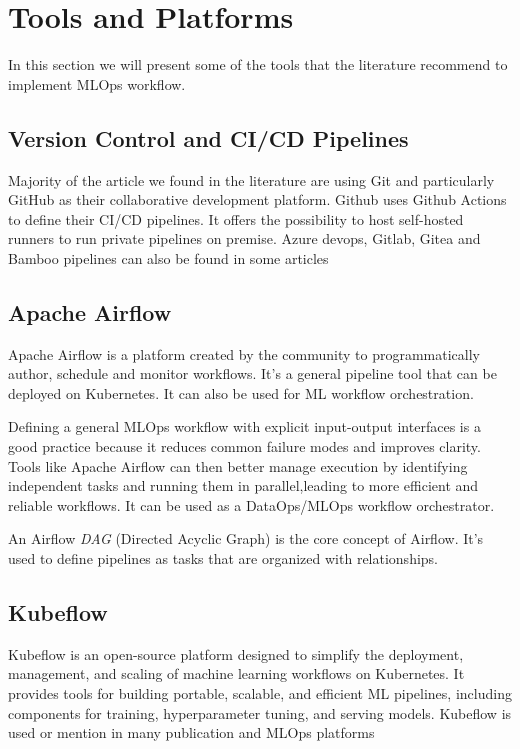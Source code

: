 \section{Tools and Platforms}\label{sec:tools}

In this section we will present some of the tools that the literature recommend to implement MLOps workflow.

\subsection{Version Control and CI/CD Pipelines}\label{subsec:version-control-and-ci/cd-pipelines}
Majority of the article we found in the literature are using Git and particularly GitHub\cite{github} as their collaborative development platform.
Github uses Github Actions to define their CI/CD pipelines.
It offers the possibility to host self-hosted runners to run private pipelines on premise.
Azure devops, Gitlab, Gitea and Bamboo pipelines can also be found in some articles\cite{Kreuzberger2022MachineLO}

\subsection{Apache Airflow}\label{subsec:apache-airflow}
Apache Airflow\cite{airflow} is a platform created by the community to programmatically author, schedule and monitor workflows\cite{airflow}.
It's a general pipeline tool that can be deployed on Kubernetes.
It can also be used for ML workflow orchestration\cite{Kreuzberger2022MachineLO}.

Defining a general MLOps workflow with explicit input-output interfaces is a good practice because it reduces common failure modes and improves clarity.
Tools like Apache Airflow can then better manage execution by identifying independent tasks and running them in parallel,leading to more efficient and reliable workflows.\cite{mlflow}
It can be used as a DataOps/MLOps workflow orchestrator\cite{10245408,mlflow}.

An Airflow \textit{DAG} (Directed Acyclic Graph) is the core concept of Airflow\cite{Kreuzberger2022MachineLO, airflow}.
It's used to define pipelines as tasks that are organized with relationships.


\subsection{Kubeflow}\label{subsec:kubeflow2}
Kubeflow\cite{Kubeflow} is an open-source platform designed to simplify the deployment, management, and scaling of machine learning workflows on Kubernetes.
It provides tools for building portable, scalable, and efficient ML pipelines, including components for training, hyperparameter tuning, and serving models.
Kubeflow is used or mention in many publication and MLOps platforms\cite{inproceedings,10855428,Kreuzberger2022MachineLO}

